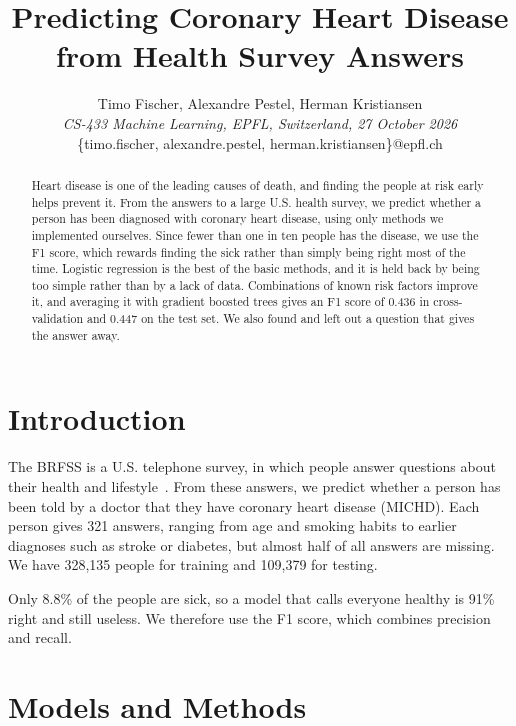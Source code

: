 \documentclass[10pt,conference,compsocconf]{IEEEtran}
\begin{document}
\title{Predicting Coronary Heart Disease\\from Health Survey Answers}

\author{
  Timo Fischer, Alexandre Pestel, Herman Kristiansen\\
  \textit{CS-433 Machine Learning, EPFL, Switzerland, 27 October 2026}\\
  \{timo.fischer, alexandre.pestel, herman.kristiansen\}@epfl.ch
}

\maketitle

\begin{abstract}
  Heart disease is one of the leading causes of death, and finding the people
  at risk early helps prevent it. From the answers to a large U.S. health
  survey, we predict whether a person has been diagnosed with coronary heart
  disease, using only methods we implemented ourselves. Since fewer than one
  in ten people has the disease, we use the F1 score, which rewards finding
  the sick rather than simply being right most of the time. Logistic regression is the best of the basic methods, and it is held back
  by being too simple rather than by a lack of data. Combinations of
  known risk factors improve it, and averaging it with gradient boosted trees
  gives an F1 score of 0.436 in cross-validation and 0.447 on the test set.
  We also found and left out a question that gives the answer away.
\end{abstract}

\section{Introduction}

The BRFSS is a U.S. telephone survey, in which people answer questions about
their health and lifestyle~\cite{brfss15}. From these answers, we predict
whether a person has been told by a doctor that they have coronary heart
disease (MICHD). Each person gives 321 answers, ranging from age and smoking
habits to earlier diagnoses such as stroke or diabetes, but almost half of
all answers are missing. We have 328,135 people for training and 109,379 for
testing.

Only 8.8\% of the people are sick, so a model that calls everyone healthy is 91\% right and still useless. We therefore use the F1 score,
which combines precision and recall.

\section{Models and Methods}
\end{document}
